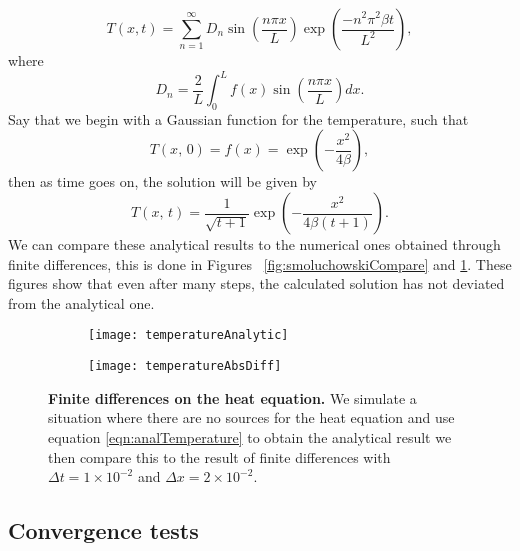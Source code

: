 \begin{equation}
T(x, t) = \sum_{n=1}^\infty D_n \sin \left(\frac{n \pi x}{L} \right) \exp\left(\frac{-n^2 \pi^2 \beta t}{L^2}\right), \label{eqn:analTemperature}
\end{equation}
where
\begin{equation}
D_n = \frac{2}{L} \int_0^L f(x) \sin \left(\frac{n \pi x}{L} \right) dx.
\end{equation}
Say that we begin with a Gaussian function for the temperature, such that
\begin{equation}
T(x, \, 0) = f(x) =  \exp{\left (-\frac{x^2}{4 \beta} \right)},
\end{equation}
then as time goes on, the solution will be given by
\begin{equation}
T(x, \, t) = \frac{1}{\sqrt{t + 1}} \exp{ \left(-\frac{x^2}{4 \beta (t + 1)} \right)}.
\end{equation}
We can compare these analytical results to the numerical ones obtained through finite differences, this is done in Figures ~\ref{fig:smoluchowskiCompare} and \ref{fig:temperatureCompare}. These figures show that even after many steps, the calculated solution has not deviated from the analytical one.
\begin{figure}
	\center
	\begin{subfigure}{0.45\textwidth}
	\texttt{[image: temperatureAnalytic]}
	\end{subfigure}
	\begin{subfigure}{0.45\textwidth}
	\texttt{[image: temperatureAbsDiff]}
	\end{subfigure}
	\caption{\textbf{Finite differences on the heat equation.} We simulate a situation where there are no sources for the heat equation and use equation \ref{eqn:analTemperature} to obtain the analytical result we then compare this to the result of finite differences with $\Delta t = 1 \times 10^{-2}$ and $\Delta x = 2 \times 10^{-2}$. \label{fig:temperatureCompare}}
\end{figure}

\subsection{Convergence tests}

